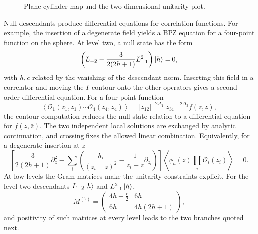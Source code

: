 \begin{figure}[htbp]
\centering
{}
\caption{Plane-cylinder map and the two-dimensional unitarity plot.}
\end{figure}

Null descendants produce differential equations for correlation
functions.  For example, the insertion of a degenerate field yields a
BPZ equation for a four-point function on the sphere.
At level two, a null state has the form
\[
  \left(L_{-2}-\frac{3}{2(2h+1)}L_{-1}^2\right)\ket h=0,
\]
with \(h,c\) related by the vanishing of the descendant norm.  Inserting
this field in a correlator and moving the \(T\)-contour onto the other
operators gives a second-order differential equation.  For a four-point
function
\[
  \left\langle
    \mathcal O_1(z_1,\bar z_1)\cdots
    \mathcal O_4(z_4,\bar z_4)
  \right\rangle
  =
  |z_{12}|^{-2\Delta_1}|z_{34}|^{-2\Delta_3} f(z,\bar z),
\]
the contour computation reduces the null-state relation to a
differential equation for \(f(z,\bar z)\).  The two independent local
solutions are exchanged by analytic continuation, and crossing fixes the
allowed linear combination.
Equivalently, for a degenerate insertion at \(z\),
\[
  \left[
    \frac{3}{2(2h+1)}\partial_z^2
    -
    \sum_i\left(
      \frac{h_i}{(z_i-z)^2}
      -\frac{1}{z_i-z}\partial_{z_i}
    \right)
  \right]
  \left\langle\phi_h(z)\prod_i\mathcal O_i(z_i)\right\rangle=0.
\]
At low levels the Gram matrices make the unitarity constraints explicit.
For the level-two descendants \(L_{-2}\ket h\) and \(L_{-1}^2\ket h\),
\[
  M^{(2)}
  =
  \begin{pmatrix}
    4h+\frac c2 & 6h\\
    6h & 4h(2h+1)
  \end{pmatrix},
\]
and positivity of such matrices at every level leads to the two
branches quoted next.

